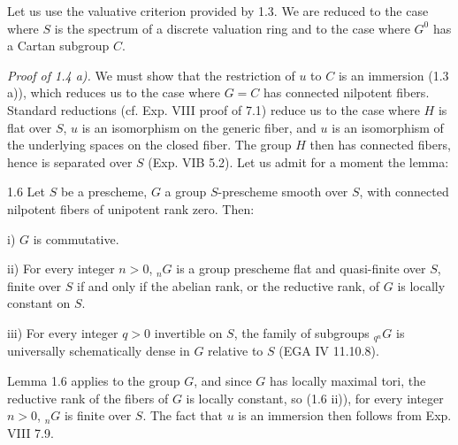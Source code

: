 Let us use the valuative criterion provided by 1.3. We are reduced to the case where $S$ is the spectrum of a discrete valuation ring and to the case where $G^0$ has a Cartan subgroup $C$.

\par\noindent\emph{Proof of 1.4 a).}
We must show that the restriction of $u$ to $C$ is an immersion (1.3 a)), which reduces us to the case where $G=C$ has connected nilpotent fibers. Standard reductions (cf. Exp. VIII proof of 7.1) reduce us to the case where $H$ is flat over $S$, $u$ is an isomorphism on the generic fiber, and $u$ is an isomorphism of the underlying spaces on the closed fiber. The group $H$ then has connected fibers, hence is separated over $S$ (Exp. VIB 5.2). Let us admit for a moment the lemma:
\begin{lemma}{1.6}\label{XVI.1.6}
Let $S$ be a prescheme, $G$ a group $S$-prescheme smooth over $S$, with connected nilpotent fibers of unipotent rank zero. Then:

\noindent i) $G$ is commutative.

\noindent ii) For every integer $n>0$, ${}_nG$ is a group prescheme flat and quasi-finite over $S$, finite over $S$ if and only if the abelian rank, or the reductive rank, of $G$ is locally constant on $S$.

\noindent iii) For every integer $q>0$ invertible on $S$, the family of subgroups ${}_{q^n}G$ is universally schematically dense in $G$ relative to $S$ (EGA IV 11.10.8).
\end{lemma}
Lemma 1.6 applies to the group $G$, and since $G$ has locally maximal tori, the reductive rank of the fibers of $G$ is locally constant, so (1.6 ii)), for every integer $n>0$, ${}_nG$ is finite over $S$. The fact that $u$ is an immersion then follows from Exp. VIII 7.9.


